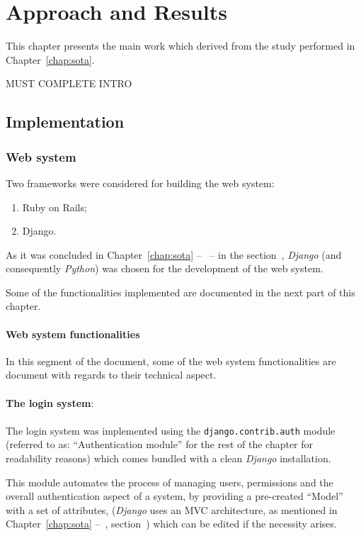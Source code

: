 \chapter{Approach and Results}\label{chap:chap4}


This chapter presents the main work which derived from the study performed in Chapter~\ref{chap:sota}.


MUST COMPLETE INTRO


\section{Implementation}\label{sec:implementation}


\subsection{Web system}

Two frameworks were considered for building the web system:

\begin{enumerate}
\item Ruby on Rails;
\item Django.
\end{enumerate}

As it was concluded in Chapter~\ref{chap:sota} --~ -- in the section~, \textit{Django} (and consequently \textit{Python}) was chosen for the development of the web system.

Some of the functionalities implemented are documented in the next part of this chapter.

\subsubsection{Web system functionalities}

In this segment of the document, some of the web system functionalities are document with regards to their technical aspect.\\
\ \\
\textbf{The login system}:\\
\ \\
The login system was implemented using the \texttt{django.contrib.auth} module (referred to as: ``Authentication module'' for the rest of the chapter for readability reasons) which comes bundled with a clean \textit{Django} installation.

This module automates the process of managing users, permissions and the overall authentication aspect of a system, by providing a pre-created ``Model'' with a set of attributes,  (\textit{Django} uses an MVC architecture, as mentioned in Chapter~\ref{chap:sota} --~, section~) which can be edited if the necessity arises.

